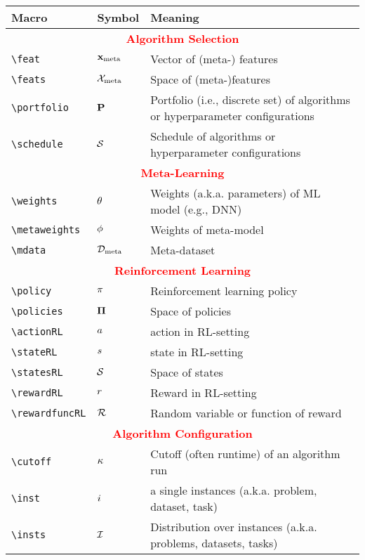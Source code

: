 \documentclass[]{article}
\begin{document}
\begin{table}
	\begin{tabular}{lll}
		\toprule
		Macro & Symbol & Meaning \\
		\midrule
		\multicolumn{3}{c}{\textcolor{red}{\textbf{Algorithm Selection}}}\\
		\verb!\feat! & $\mathbf{x}_{\text{meta}}$ & Vector of (meta-) features\\
		\verb!\feats! & $\mathcal{X}_{\text{meta}}$ & Space of (meta-)features \\
		\verb!\portfolio! & $\mathbf{P}$ & Portfolio (i.e., discrete set) of algorithms or hyperparameter configurations\\
		\verb!\schedule! & $\mathcal{S}$ & Schedule of algorithms or hyperparameter configurations\\
		\midrule
		\multicolumn{3}{c}{\textcolor{red}{\textbf{Meta-Learning}}}\\
		\verb!\weights! & $\theta$ & Weights (a.k.a. parameters) of ML model (e.g., DNN)\\
		\verb!\metaweights! & $\phi$ & Weights of meta-model\\
    \verb!\mdata! & $\mathcal{D}_{\text{meta}}$ & Meta-dataset\\
		\midrule
		\multicolumn{3}{c}{\textcolor{red}{\textbf{Reinforcement Learning}}}\\
		\verb!\policy! & $\pi$ & Reinforcement learning policy\\
		\verb!\policies! & $\mathbf{\Pi}$ & Space of policies\\
		\verb!\actionRL! & $a$ & action in RL-setting\\
		\verb!\stateRL! & $s$ & state in RL-setting\\
		\verb!\statesRL! & $\mathcal{S}$ & Space of states\\
		\verb!\rewardRL! & $r$ & Reward in RL-setting\\
		\verb!\rewardfuncRL! & $\mathcal{R}$ & Random variable or function of reward\\
		\midrule
		\multicolumn{3}{c}{\textcolor{red}{\textbf{Algorithm Configuration}}}\\
		\verb!\cutoff! & $\kappa$ & Cutoff (often runtime) of an algorithm run\\
		\verb!\inst! & $i$ & a single instances (a.k.a. problem, dataset, task)\\
		\verb!\insts! & $\mathcal{I}$ & Distribution over instances (a.k.a. problems, datasets, tasks)\\
		\bottomrule
	\end{tabular}
\end{table}
\end{document}
